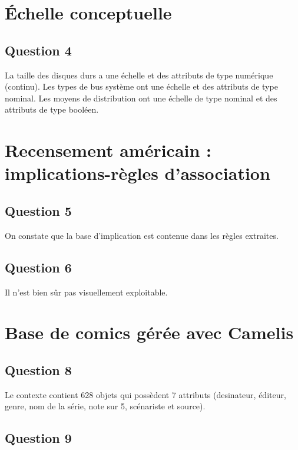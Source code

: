 \documentclass[a4paper,12pt]{article}
\begin{document}
\section{\'Echelle conceptuelle}

\subsection*{Question 4}

La taille des disques durs a une échelle et des attributs de type numérique (continu). Les types de bus système ont une échelle et des attributs de type nominal. Les moyens de distribution ont une échelle de type nominal et des attributs de type booléen.



\section{Recensement américain : implications-règles d'association}

\subsection*{Question 5}

On constate que la base d'implication est contenue dans les règles extraites.


\subsection*{Question 6}

Il n'est bien sûr pas visuellement exploitable.



\section{Base de comics gérée avec Camelis}

\subsection*{Question 8}

Le contexte contient 628 objets qui possèdent 7 attributs (desinateur, éditeur, genre, nom de la série, note sur 5, scénariste et source).


\subsection*{Question 9}
\end{document}
